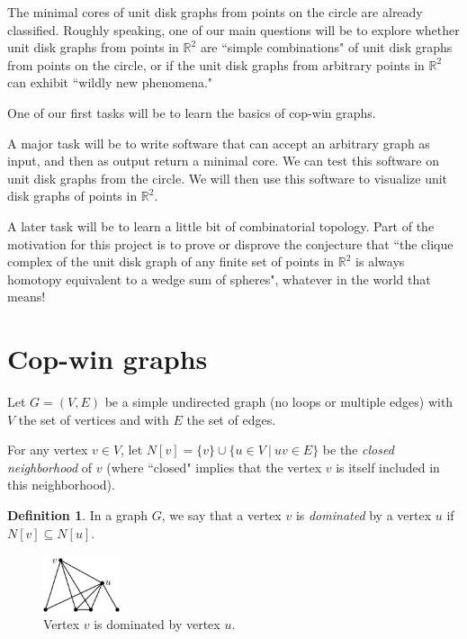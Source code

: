 \documentclass[amscd, amssymb, verbatim]{amsart}[12pt]
\theoremstyle{plain}
\theoremstyle{definition}
\newtheorem{definition}[lemma]{Definition}
\newcommand{\R}{\mathbb{R}}
\begin{document}
The minimal cores of unit disk graphs from points on the circle are already classified.
Roughly speaking, one of our main questions will be to explore whether unit disk graphs from points in $\R^2$ are ``simple combinations" of unit disk graphs from points on the circle, or if the unit disk graphs from arbitrary points in $\R^2$ can exhibit ``wildly new phenomena."

One of our first tasks will be to learn the basics of cop-win graphs.

A major task will be to write software that can accept an arbitrary graph as input, and then as output return a minimal core.
We can test this software on unit disk graphs from the circle.
We will then use this software to visualize unit disk graphs of points in $\R^2$.

A later task will be to learn a little bit of combinatorial topology.
Part of the motivation for this project is to prove or disprove the conjecture that ``the clique complex of the unit disk graph of any finite set of points in $\R^2$ is always homotopy equivalent to a wedge sum of spheres", whatever in the world that means!

\section{Cop-win graphs}\label{sec:cop-win}

Let $G=(V,E)$ be a simple undirected graph (no loops or multiple edges) with $V$ the set of vertices and with $E$ the set of edges.

For any vertex $v\in V$, let $N[v]=\{v\}\cup\{u\in V~|~uv\in E\}$ be the \emph{closed neighborhood} of $v$ (where ``closed" implies that the vertex $v$ is itself included in this neighborhood).
\begin{definition}\label{def:dominated}
In a graph $G$, we say that a vertex $v$ is \emph{dominated} by a vertex $u$ if $N[v]\subseteq N[u]$.
\end{definition}

\begin{figure}[h]
\centering
\includegraphics[width=0.2\textwidth]{Dominated1_labeled.pdf}
\caption{Vertex $v$ is dominated by vertex $u$.}
\label{fig:dominated}
\end{figure}
\end{document}
